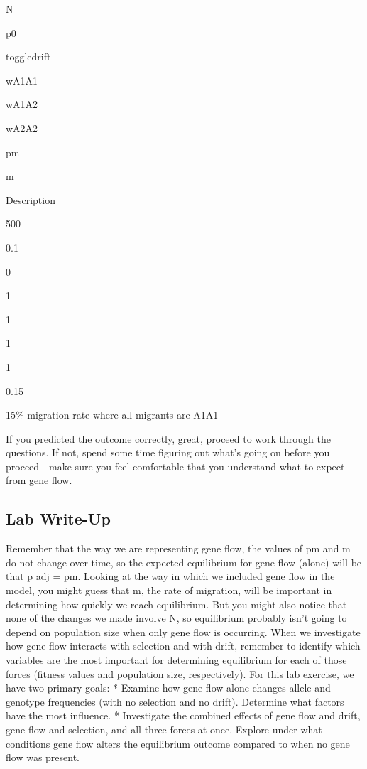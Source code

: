 \begin{enumerate}
  N

  p0

  toggledrift

  wA1A1

  wA1A2

  wA2A2

  pm

  m

  Description

  500

  0.1

  0

  1

  1

  1

  1

  0.15

  15\% migration rate where all migrants are A1A1

  If you predicted the outcome correctly, great, proceed to work through
  the questions. If not, spend some time figuring out what's going on
  before you proceed - make sure you feel comfortable that you
  understand what to expect from gene flow.
\end{enumerate}

\subsection{Lab Write-Up}\label{lab-write-up}

Remember that the way we are representing gene flow, the values of pm
and m do not change over time, so the expected equilibrium for gene flow
(alone) will be that p adj = pm. Looking at the way in which we included
gene flow in the model, you might guess that m, the rate of migration,
will be important in determining how quickly we reach equilibrium. But
you might also notice that none of the changes we made involve N, so
equilibrium probably isn't going to depend on population size when only
gene flow is occurring. When we investigate how gene flow interacts with
selection and with drift, remember to identify which variables are the
most important for determining equilibrium for each of those forces
(fitness values and population size, respectively). For this lab
exercise, we have two primary goals: * Examine how gene flow alone
changes allele and genotype frequencies (with no selection and no
drift). Determine what factors have the most influence. * Investigate
the combined effects of gene flow and drift, gene flow and selection,
and all three forces at once. Explore under what conditions gene flow
alters the equilibrium outcome compared to when no gene flow was
present.

